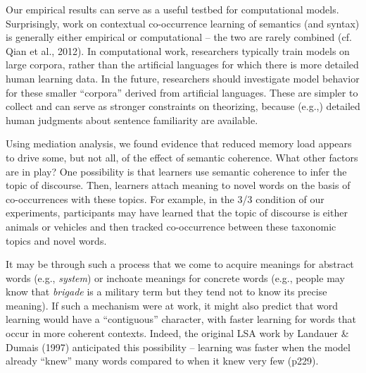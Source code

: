 \documentclass[man,floatsintext]{apa6}
\begin{document}
Our empirical results can serve as a useful testbed for computational models. Surprisingly, work on contextual co-occurrence learning of semantics (and syntax) is generally either empirical or computational -- the two are rarely combined (cf. Qian et al., 2012).  In computational work, researchers typically train models on large corpora, rather than the artificial languages for which there is more detailed human learning data. In the future, researchers should investigate model behavior for these smaller ``corpora'' derived from artificial languages. These are simpler to collect and can serve as stronger constraints on theorizing, because (e.g.,) detailed human judgments about sentence familiarity are available.


Using mediation analysis, we found evidence that reduced memory load appears to drive some, but not all, of the effect of semantic coherence. What other factors are in play? One possibility is that learners use semantic coherence to infer the topic of discourse. Then, learners attach meaning to novel words on the basis of co-occurrences with these topics. For example, in the 3/3 condition of our experiments, participants may have learned that the topic of discourse is either animals or vehicles and then tracked co-occurrence between these taxonomic topics and novel words.

It may be through such a process that we come to acquire meanings for abstract words (e.g., \emph{system}) or inchoate meanings for concrete words (e.g., people may know that \emph{brigade} is a military term but they tend not to know its precise meaning). If such a mechanism were at work, it might also predict that word learning would have a ``contiguous'' character, with faster learning for words that occur in more coherent contexts. Indeed, the original LSA work by Landauer \& Dumais (1997) anticipated this possibility -- learning was faster when the model already ``knew'' many words compared to when it knew very few (p229).
\end{document}

